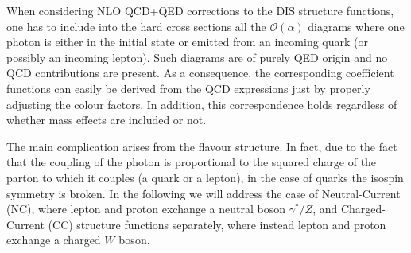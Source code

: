 When considering NLO QCD+QED corrections to the DIS structure
functions, one has to include into the hard cross sections all the
$\mathcal{O}(\alpha)$ diagrams where one photon is either in the
initial state or emitted from an incoming quark (or possibly an
incoming lepton). Such diagrams are of purely QED origin and no QCD
contributions are present. As a consequence, the corresponding
coefficient functions can easily be derived from the QCD expressions
just by properly adjusting the colour factors. In addition, this
correspondence holds regardless of whether mass effects are included
or not.

The main complication arises from the flavour structure. In fact, due
to the fact that the coupling of the photon is proportional to the
squared charge of the parton to which it couples (a quark or a
lepton), in the case of quarks the isospin symmetry is broken. In the
following we will address the case of Neutral-Current (NC), where
lepton and proton exchange a neutral boson $\gamma^*/Z$, and
Charged-Current (CC) structure functions separately, where instead
lepton and proton exchange a charged $W$ boson.


